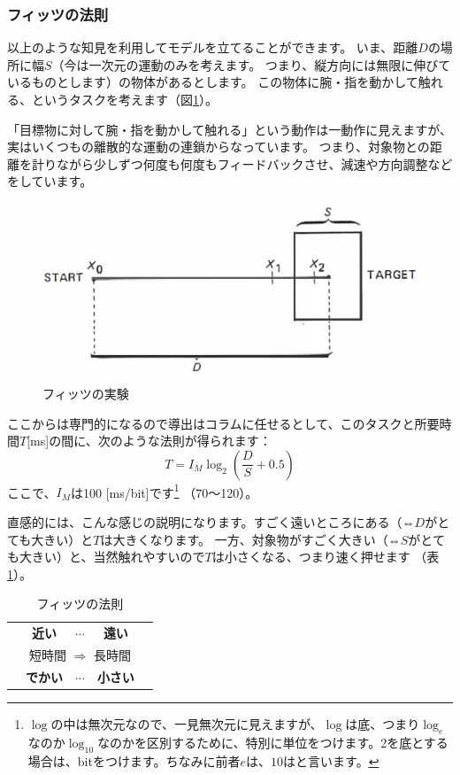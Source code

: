 \subsubsection*{フィッツの法則}

以上のような知見を利用してモデルを立てることができます。
いま、距離$D$の場所に幅$S$（今は一次元の運動のみを考えます。
つまり、縦方向には無限に伸びているものとします）の物体があるとします。
この物体に腕・指を動かして触れる、というタスクを考えます（図\ref{fig:fitts}）。

「目標物に対して腕・指を動かして触れる」という動作は一動作に見えますが、実はいくつもの離散的な運動の連鎖からなっています。
つまり、対象物との距離を計りながら少しずつ何度も何度もフィードバックさせ、減速や方向調整などをしています。

\begin{figure}[htbp]
 \begin{center}
  \includegraphics[width=0.5\hsize]{fitts.eps}
 \end{center}
 \caption{フィッツの実験}
 \label{fig:fitts}
\end{figure}

ここからは専門的になるので導出はコラムに任せるとして、このタスクと所要時間$T$[ms]の間に、次のような法則が得られます：
\[
  T = I_M \log_2 \left(\frac{D}{S} + 0.5\right)
\]
ここで、$I_M$は100 [ms/bit]です\footnote{$\log$の中は無次元なので、一見無次元に見えますが、$\log$は底、つまり$\log_{e}$なのか$\log_{10}$なのかを区別するために、特別に単位をつけます。2を底とする場合は、bitをつけます。ちなみに前者$e$は、$10$はと言います。}%
（70～120）。

直感的には、こんな感じの説明になります。すごく遠いところにある（⇔$D$がとても大きい）と$T$は大きくなります。
一方、対象物がすごく大きい（⇔$S$がとても大きい）と、当然触れやすいので$T$は小さくなる、つまり速く押せます
（表\ref{tbl:fitts2}）。

\begin{table}[htbp]
 \begin{center}
 \caption{フィッツの法則}
 \begin{tabular}{ccccc}
 \hline
  & {\bf\LARGE 近い} & $\cdots$ & {\bf\small 遠い} \\
  & \multicolumn{3}{c}{短時間 $\Longrightarrow$ 長時間} \\
  & {\bf\LARGE でかい} & $\cdots$ & {\bf\small 小さい} \\
 \hline
  \end{tabular}
  \label{tbl:fitts2}
\end{center}
\end{table}


